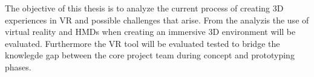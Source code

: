 The objective of this thesis is to analyze the current process of creating 3D experiences in VR and possible challenges that arise. From the analyzis the use of virtual reality and HMDs when creating an immersive 3D environment will be evaluated. Furthermore the VR tool will be evaluated tested to bridge the knowlegde gap between the core project team during concept and prototyping phases.

